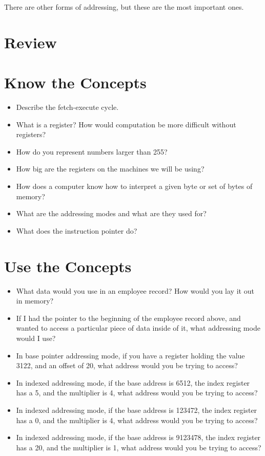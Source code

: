 There are other forms of addressing, but these are the most
important  ones.

\section{Review}

\section{Know the Concepts}

\begin{itemize}\item Describe the fetch-execute cycle. 
\item What is a register?  How would computation be more difficult without registers? 
\item How do you represent numbers larger than 255? 
\item How big are the registers on the machines we will be using? 
\item How does a computer know how to interpret a given byte or set of bytes of memory? 
\item What are the addressing modes and what are they used for? 
\item What does the instruction pointer do? 
\end{itemize}

\section{Use the Concepts}

\begin{itemize}\item What data would you use in an employee record?  How would you lay it out in memory? 
\item If I had the pointer to the beginning of the employee record above, and wanted to access a particular piece of data inside of it, what addressing mode would I use? 
\item In base pointer addressing mode, if you have a register holding the value 3122, and an offset of 20, what address would you be trying to access? 
\item In indexed addressing mode, if the base address is 6512, the index register has a 5, and the multiplier is 4, what address would you be trying to access? 
\item In indexed addressing mode, if the base address is 123472, the index register has a 0, and the multiplier is 4, what address would you be trying to access? 
\item In indexed addressing mode, if the base address is 9123478, the index register has a 20, and the multiplier is 1, what address would you be trying to access? 
\end{itemize}

